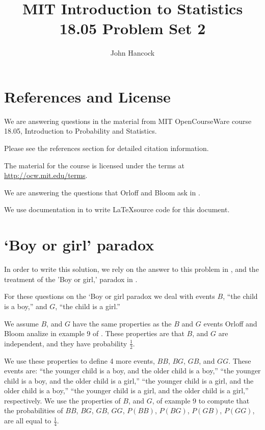 \documentclass[a4paper,11pt]{article}
\author{John Hancock}
\title{MIT Introduction to Statistics 18.05 Problem Set 2 }
\begin{document}
\maketitle
\tableofcontents
\section{References and License}
We are answering questions in the material from MIT OpenCourseWare
course 18.05, Introduction to Probability and Statistics.

Please see the references section for detailed citation information.

The material for the course is licensed under the terms at 
\url{http://ocw.mit.edu/terms}.

We are answering the questions that Orloff and Bloom ask in
\cite{probSet2}.

We use documentation in \cite{latexSpecialChars} to write \LaTeX source
code for this document.

\section{`Boy or girl' paradox}

In order to write this solution, we rely on the answer to this problem
in \cite{probSet2Ans}, and the treatment of the 'Boy or girl,' paradox
in \cite{boyGirlWiki}.

For these questions on the `Boy or girl paradox we deal with events
$B$, ``the child is a boy,'' and $G$, ``the child is a girl.''

We assume $B$, and $G$ have the same properties as the $B$ and $G$
events Orloff and Bloom analize in example 9 of \cite{reading4}.
These properties are that $B$, and $G$ are independent, and they have
probability $\frac{1}{2}$.

We use these properties to define 4 more events, $BB$, $BG$, $GB$,
and $GG$.  These events are: ``the younger child is a boy, and the older
child is a boy,'' ``the younger child is a boy, and the older child is a
girl,'' ``the younger child is a girl, and the older child is a boy,''
``the younger child is a girl, and the older child is a girl,'' 
respectively.  We use the properties of $B$, and $G$, of example 9 to
compute that the probabilities of $BB$, $BG$, $GB$, $GG$, 
$P\left( BB \right)$, $P\left( BG \right)$, $P\left( GB \right)$, 
$P\left( GG \right)$, are all equal to $\frac{1}{4}$.
\end{document}
